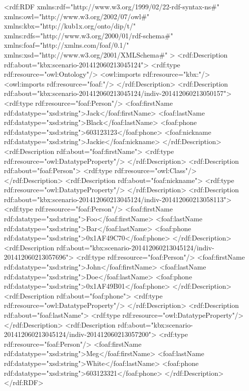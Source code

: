 \begtt
<rdf:RDF
    xmlns:rdf="http://www.w3.org/1999/02/22-rdf-syntax-ns#"
    xmlns:owl="http://www.w3.org/2002/07/owl#"
    xmlns:kbx="http://kub1x.org/onto/dip/t/"
    xmlns:rdfs="http://www.w3.org/2000/01/rdf-schema#"
    xmlns:foaf="http://xmlns.com/foaf/0.1/"
    xmlns:xsd="http://www.w3.org/2001/XMLSchema#" > 
  <rdf:Description rdf:about="kbx:scenario-201412060213045124">
    <rdf:type rdf:resource="owl:Ontology"/>
    <owl:imports rdf:resource="kbx:"/>
    <owl:imports rdf:resource="foaf:"/>
  </rdf:Description>
  <rdf:Description rdf:about="kbx:scenario-201412060213045124/indiv-201412060213050157">
    <rdf:type rdf:resource="foaf:Person"/>
    <foaf:firstName rdf:datatype="xsd:string">Jack</foaf:firstName>
    <foaf:lastName rdf:datatype="xsd:string">Black</foaf:lastName>
    <foaf:phone rdf:datatype="xsd:string">603123123</foaf:phone>
    <foaf:nickname rdf:datatype="xsd:string">Jackie</foaf:nickname>
  </rdf:Description>
  <rdf:Description rdf:about="foaf:firstName">
    <rdf:type rdf:resource="owl:DatatypeProperty"/>
  </rdf:Description>
  <rdf:Description rdf:about="foaf:Person">
    <rdf:type rdf:resource="owl:Class"/>
  </rdf:Description>
  <rdf:Description rdf:about="foaf:nickname">
    <rdf:type rdf:resource="owl:DatatypeProperty"/>
  </rdf:Description>
  <rdf:Description rdf:about="kbx:scenario-201412060213045124/indiv-201412060213058113">
    <rdf:type rdf:resource="foaf:Person"/>
    <foaf:firstName rdf:datatype="xsd:string">Foo</foaf:firstName>
    <foaf:lastName rdf:datatype="xsd:string">Bar</foaf:lastName>
    <foaf:phone rdf:datatype="xsd:string">0x1AF49C70</foaf:phone>
  </rdf:Description>
  <rdf:Description rdf:about="kbx:scenario-201412060213045124/indiv-201412060213057696">
    <rdf:type rdf:resource="foaf:Person"/>
    <foaf:firstName rdf:datatype="xsd:string">John</foaf:firstName>
    <foaf:lastName rdf:datatype="xsd:string">Doe</foaf:lastName>
    <foaf:phone rdf:datatype="xsd:string">0x1AF49B01</foaf:phone>
  </rdf:Description>
  <rdf:Description rdf:about="foaf:phone">
    <rdf:type rdf:resource="owl:DatatypeProperty"/>
  </rdf:Description>
  <rdf:Description rdf:about="foaf:lastName">
    <rdf:type rdf:resource="owl:DatatypeProperty"/>
  </rdf:Description>
  <rdf:Description rdf:about="kbx:scenario-201412060213045124/indiv-201412060213057200">
    <rdf:type rdf:resource="foaf:Person"/>
    <foaf:firstName rdf:datatype="xsd:string">Meg</foaf:firstName>
    <foaf:lastName rdf:datatype="xsd:string">White</foaf:lastName>
    <foaf:phone rdf:datatype="xsd:string">603123321</foaf:phone>
  </rdf:Description>
</rdf:RDF>
\endtt


